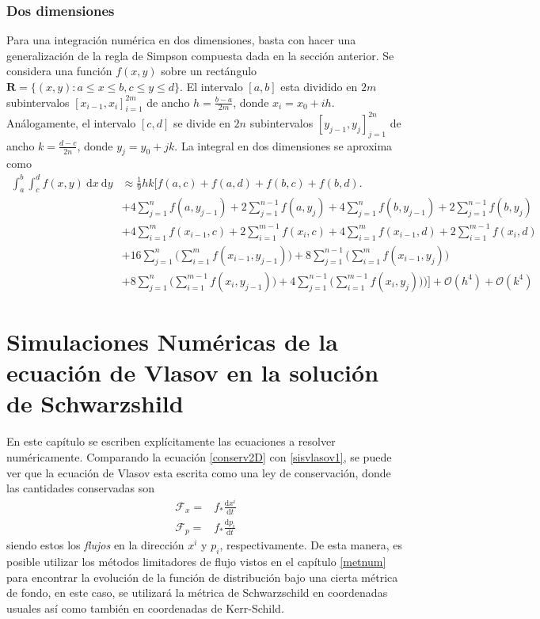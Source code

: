 \documentclass[11pt,twoside,openright,spanish]{report}
\numberwithin{equation}{chapter}
\numberwithin{figure}{chapter}
\numberwithin{table}{chapter}
\begin{document}
\subsection{Dos dimensiones}
\noindent
Para una integración numérica en dos dimensiones, basta con hacer una generalización de la regla de Simpson compuesta dada en la sección anterior. Se considera una función $f(x,y)$ sobre un rectángulo $\mathbf{R}=\{(x,y):a\leq x\leq b, c\leq y\leq d\}$. El intervalo $[a,b]$ esta dividido en $2m$ subintervalos $\left[x_{i-1},x_i\right]_{i=1}^{2m}$ de ancho $h=\frac{b-a}{2m}$, donde $x_i=x_0+ih$. Análogamente, el intervalo $[c,d]$ se divide en $2n$ subintervalos $\left[y_{j-1},y_j\right]_{j=1}^{2n}$ de ancho $k=\frac{d-c}{2n}$, donde $y_j=y_0+jk$. La integral en dos dimensiones se aproxima como
\begin{align*}
\int_a^b \int_c^d f(x,y)\ \text{d}x\ \text{d}y&\approx \frac{1}{9}hk\Bigg[f(a,c)+f(a,d)+f(b,c)+f(b,d)\bigg.\\
&+4\sum_{j=1}^n f(a,y_{j-1})+2\sum_{j=1}^{n-1}f(a,y_j)+4\sum_{j=1}^{n}f(b,y_{j-1})+2\sum_{j=1}^{n-1}f(b,y_j)\\
&+4\sum_{i=1}^m f(x_{i-1},c)+2\sum_{i=1}^{m-1}f(x_i,c)+4\sum_{i=1}^{m}f(x_{i-1},d)+2\sum_{i=1}^{m-1}f(x_i,d)\\
&+16\sum_{j=1}^{n}\bigg(\sum_{i=1}^{m}f(x_{i-1},y_{j-1})\bigg)+8\sum_{j=1}^{n-1}\bigg(\sum_{i=1}^m f(x_{i-1},y_j)\bigg)\\
&+8\sum_{j=1}^n\bigg(\sum_{i=1}^{m-1}f(x_i,y_{j-1})\bigg)+4\sum_{j=1}^{n-1}\bigg(\sum_{i=1}^{m-1}f(x_i,y_j)\bigg))\Bigg]+\mathcal{O}(h^4)+\mathcal{O}(k^4)
\end{align*}

\chapter{Simulaciones Numéricas de la ecuación de Vlasov en la solución de Schwarzshild}
\noindent
En este capítulo se escriben explícitamente las ecuaciones a resolver numéricamente. Comparando la ecuación \eqref{conserv2D} con \eqref{sisvlasov1}, se puede ver que la ecuación de Vlasov esta escrita como una ley de conservación, donde las cantidades conservadas son
\begin{align}
\mathcal{F}_x=&f_*\frac{\text{d}x^i}{\text{d}t}\\
\mathcal{F}_p=&f_*\frac{\text{d}p_i}{\text{d}t}
\end{align}
siendo estos los \textit{flujos} en la dirección $x^i$ y $p_i$, respectivamente. De esta manera, es posible utilizar los métodos limitadores de flujo vistos en el capítulo \ref{metnum} para encontrar la evolución de la función de distribución bajo una cierta métrica de fondo, en este caso, se utilizará la métrica de Schwarzschild en coordenadas usuales así como también en coordenadas de Kerr-Schild. 
\end{document}
